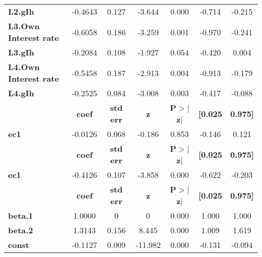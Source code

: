 \begin{center}
\begin{tabular}{lcccccc}
\textbf{L2.gIh}               &      -0.4643  &        0.127     &    -3.644  &         0.000        &       -0.714    &       -0.215     \\
\textbf{L3.Own Interest rate} &      -0.6058  &        0.186     &    -3.259  &         0.001        &       -0.970    &       -0.241     \\
\textbf{L3.gIh}               &      -0.2084  &        0.108     &    -1.927  &         0.054        &       -0.420    &        0.004     \\
\textbf{L4.Own Interest rate} &      -0.5458  &        0.187     &    -2.913  &         0.004        &       -0.913    &       -0.179     \\
\textbf{L4.gIh}               &      -0.2525  &        0.084     &    -3.008  &         0.003        &       -0.417    &       -0.088     \\
             & \textbf{coef} & \textbf{std err} & \textbf{z} & \textbf{P$> |$z$|$} & \textbf{[0.025} & \textbf{0.975]}  \\
\midrule
\textbf{ec1} &      -0.0126  &        0.068     &    -0.186  &         0.853        &       -0.146    &        0.121     \\
             & \textbf{coef} & \textbf{std err} & \textbf{z} & \textbf{P$> |$z$|$} & \textbf{[0.025} & \textbf{0.975]}  \\
\midrule
\textbf{ec1} &      -0.4126  &        0.107     &    -3.858  &         0.000        &       -0.622    &       -0.203     \\
                & \textbf{coef} & \textbf{std err} & \textbf{z} & \textbf{P$> |$z$|$} & \textbf{[0.025} & \textbf{0.975]}  \\
\midrule
\textbf{beta.1} &       1.0000  &            0     &         0  &         0.000        &        1.000    &        1.000     \\
\textbf{beta.2} &       1.3143  &        0.156     &     8.445  &         0.000        &        1.009    &        1.619     \\
\textbf{const}  &      -0.1127  &        0.009     &   -11.982  &         0.000        &       -0.131    &       -0.094     \\
\bottomrule
\end{tabular}
\end{center}